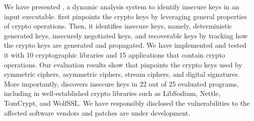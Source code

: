 We have presented \sysname, a dynamic analysis system to identify insecure keys in an input executable. \sysname first pinpoints the crypto keys by leveraging general properties of crypto operations. 
Then, it identifies insecure keys, namely, deterministic generated keys, insecurely negotiated keys, and recoverable keys by tracking how the crypto keys are generated and propagated. 
We have implemented \sysname and tested it with 10 cryptographic libraries and 15 applications that contain crypto operations. 
Our evaluation results show that \sysname pinpoints the crypto keys used by symmetric ciphers, asymmetric ciphers, stream ciphers, and digital signatures.  
More importantly, \sysname discovers insecure keys in 22 out of 25 evaluated programs, including in well-established crypto libraries such as \textsf{\small LibSodium}, \textsf{\small Nettle}, \textsf{\small TomCrypt}, and \textsf{\small WolfSSL}. 
We have responsibly disclosed the vulnerabilities to the affected software vendors and patches are under development.
